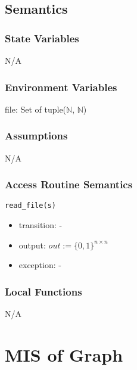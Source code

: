 \documentclass[12pt, titlepage]{article}
\begin{document}
\subsection{Semantics}

\subsubsection{State Variables}

N/A

\subsubsection{Environment Variables}

file: Set of tuple($\mathbb{N}$, $\mathbb{N}$)

\subsubsection{Assumptions}

N/A

\subsubsection{Access Routine Semantics}

\noindent \texttt{read\_file(s)}
\begin{itemize}
\item transition: - 
\item output:   $out:= \{0,1\}^{n \times n}$
\item exception: -  
\end{itemize}



\subsubsection{Local Functions}

N/A

\newpage

\section{MIS of Graph} \label{Module} 
\end{document}
